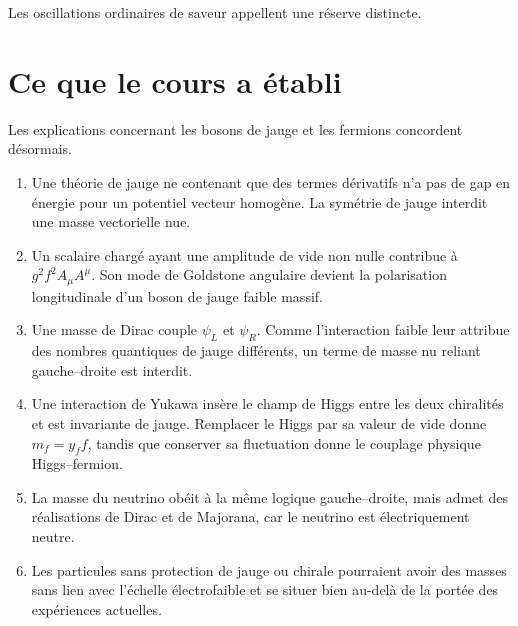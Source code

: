 Les oscillations ordinaires de saveur appellent une réserve distincte.

\begin{classroomqa}
\end{classroomqa}

\section{Ce que le cours a établi}

Les explications concernant les bosons de jauge et les fermions concordent désormais.

\begin{enumerate}
  \item Une théorie de jauge ne contenant que des termes dérivatifs n’a pas de gap en énergie pour un potentiel vecteur homogène. La symétrie de jauge interdit une masse vectorielle nue.
  \item Un scalaire chargé ayant une amplitude de vide non nulle contribue à
\(g^2f^2A_\mu A^\mu\). Son mode de Goldstone angulaire devient la polarisation longitudinale d’un boson de jauge faible massif.
  \item Une masse de Dirac couple \(\psi_L\) et \(\psi_R\). Comme l’interaction faible leur attribue des nombres quantiques de jauge différents, un terme de masse nu reliant gauche--droite est interdit.
  \item Une interaction de Yukawa insère le champ de Higgs entre les deux chiralités et est invariante de jauge. Remplacer le Higgs par sa valeur de vide donne \(m_f=y_ff\), tandis que conserver sa fluctuation donne le couplage physique Higgs--fermion.
  \item La masse du neutrino obéit à la même logique gauche--droite, mais admet des réalisations de Dirac et de Majorana, car le neutrino est électriquement neutre.
  \item Les particules sans protection de jauge ou chirale pourraient avoir des masses sans lien avec l’échelle électrofaible et se situer bien au-delà de la portée des expériences actuelles.
\end{enumerate}

